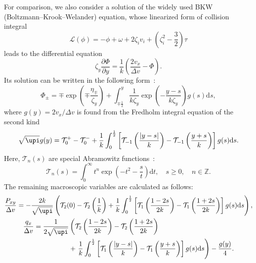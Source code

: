 \documentclass[]{jfm}
\newcommand{\dd}{\mathrm{d}}
\newcommand{\pder}[2][]{\frac{\partial#1}{\partial#2}}
\begin{document}
For comparison, we also consider a solution of the widely used BKW (Boltzmann--Krook--Welander) equation,
whose linearized form of collision integral
\begin{equation}\label{eq:linear_bkw}
    \mathcal{L}(\phi) = -\phi + \omega + 2\zeta_i v_i + \left(\zeta_i^2-\frac32\right)\tau
\end{equation}
leads to the differential equation
\begin{equation}\label{eq:linear_bkw_equation}
    \zeta_y \pder[\Phi]{y} = \frac1{k}\left( \frac{2v_x}{\Delta{v}} - \Phi \right).
\end{equation}
Its solution can be written in the following form~\citep{Willis1962}:
\begin{equation}\label{eq:bkw_solution}
    \Phi_\pm = \mp \exp\left(\mp\frac{\eta_\mp}{\zeta_y}\right) +
        \int_{\mp\frac12}^y \frac1{k\zeta_y} \exp \left(-\frac{y-s}{k\zeta_y}\right) g(s) \dd{s},
\end{equation}
where \(g(y) = 2v_x/\Delta v\) is found from the Fredholm integral equation of the second kind
\begin{equation}\label{eq:bkw_g_equation}
    \sqrt{\upi} g(y) = \mathcal{T}_0^+ - \mathcal{T}_0^-
        + \frac1k \int_0^{\frac12} \left[ \mathcal{T}_{-1}\left(\frac{|y-s|}{k}\right)
        - \mathcal{T}_{-1}\left(\frac{y+s}{k}\right) \right] g(s) \dd{s}.
\end{equation}
Here, \(\mathcal{T}_n(s)\) are special Abramowitz functions~\citep{Abramowitz1972}:
\begin{equation}\label{eq:Abramowitz}
    \mathcal{T}_n(s) = \int_0^\infty t^n \exp\left(-t^2-\frac{s}{t}\right) \dd t,
    \quad s\ge0, \quad n \in \mathbb{Z}.
\end{equation}
The remaining macroscopic variables are calculated as follows:
\begin{gather}
    \frac{P_{xy}}{\Delta v} = -\frac{2k}{\sqrt{\upi}} \left(
        \mathcal{T}_2(0)-\mathcal{T}_2\left(\frac1k\right)
        + \frac1k\int_0^{\frac12}\left[
            \mathcal{T}_1\left(\frac{1-2s}{2k}\right)-\mathcal{T}_1\left(\frac{1+2s}{2k}\right)
        \right]g(s)\dd{s}
        \right), \label{eq:bkw_macro_Pxy} \\
    \begin{aligned}
    \frac{q_x}{\Delta v} = \frac1{2\sqrt{\upi}}&\left(
        \mathcal{T}_2\left(\frac{1-2s}{2k}\right) - \mathcal{T}_2\left(\frac{1+2s}{2k}\right)\right. \\
        &+\left. \frac1k\int_0^{\frac12}\left[
            \mathcal{T}_1\left(\frac{|y-s|}k\right)-\mathcal{T}_1\left(\frac{y+s}k\right)
        \right]g(s)\dd{s}
        \right) - \frac{g(y)}4.
    \end{aligned} \label{eq:bkw_macro_qx}
\end{gather}
\end{document}
